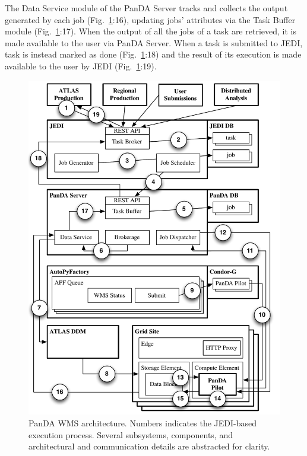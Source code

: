 The Data Service module of the PanDA Server tracks and collects the output
generated by each job (Fig.~\ref{fig:architecture}:16), updating jobs'
attributes via the Task Buffer module (Fig.~\ref{fig:architecture}:17). When the
output of all the jobs of a task are retrieved, it is made available to the user
via PanDA Server. When a task is submitted to JEDI, task is instead marked as
done (Fig.~\ref{fig:architecture}:18) and the result of its execution is made
available to the user by JEDI (Fig.~\ref{fig:architecture}:19).

\begin{figure}
    \centering
    \includegraphics[width=\columnwidth]{figures/panda_architecture.pdf}
    \caption{PanDA WMS architecture. Numbers indicates the JEDI-based execution
    process. Several subsystems, components, and architectural and
    communication details are abstracted for clarity.}
\label{fig:architecture}
\end{figure}
